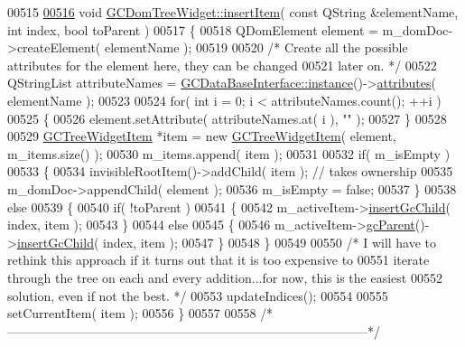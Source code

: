 \begin{DoxyCode}
00515 
\hypertarget{gcdomtreewidget_8cpp_source_l00516}{}\hyperlink{class_g_c_dom_tree_widget_a5e4117a9b47ac0bd520d32fc54d5f1ed}{00516} \textcolor{keywordtype}{void} \hyperlink{class_g_c_dom_tree_widget_a5e4117a9b47ac0bd520d32fc54d5f1ed}{GCDomTreeWidget::insertItem}( \textcolor{keyword}{const} QString &elementName, \textcolor{keywordtype}{int} index, \textcolor{keywordtype}{bool} 
      toParent )
00517 \{
00518   QDomElement element = m\_domDoc->createElement( elementName );
00519 
00520   \textcolor{comment}{/* Create all the possible attributes for the element here, they can be
       changed}
00521 \textcolor{comment}{    later on. */}
00522   QStringList attributeNames = \hyperlink{class_g_c_data_base_interface_a1baea9c0667aa8b610ec30076fcab84c}{GCDataBaseInterface::instance}()->\hyperlink{class_g_c_data_base_interface_afb1e49e08f98ca453f9ac66340a35642}{attributes}( 
      elementName );
00523 
00524   \textcolor{keywordflow}{for}( \textcolor{keywordtype}{int} i = 0; i < attributeNames.count(); ++i )
00525   \{
00526     element.setAttribute( attributeNames.at( i ), \textcolor{stringliteral}{""} );
00527   \}
00528 
00529   \hyperlink{class_g_c_tree_widget_item}{GCTreeWidgetItem} *item = \textcolor{keyword}{new} \hyperlink{class_g_c_tree_widget_item}{GCTreeWidgetItem}( element, m\_items.size() );
00530   m\_items.append( item );
00531 
00532   \textcolor{keywordflow}{if}( m\_isEmpty )
00533   \{
00534     invisibleRootItem()->addChild( item );  \textcolor{comment}{// takes ownership}
00535     m\_domDoc->appendChild( element );
00536     m\_isEmpty = \textcolor{keyword}{false};
00537   \}
00538   \textcolor{keywordflow}{else}
00539   \{
00540     \textcolor{keywordflow}{if}( !toParent )
00541     \{
00542       m\_activeItem->\hyperlink{class_g_c_tree_widget_item_a197806cd712ae04b129acd1699674df5}{insertGcChild}( index, item );
00543     \}
00544     \textcolor{keywordflow}{else}
00545     \{
00546       m\_activeItem->\hyperlink{class_g_c_tree_widget_item_a1125dbc55a8ba3e50662b8258cb35fdf}{gcParent}()->\hyperlink{class_g_c_tree_widget_item_a197806cd712ae04b129acd1699674df5}{insertGcChild}( index, item );
00547     \}
00548   \}
00549 
00550   \textcolor{comment}{/* I will have to rethink this approach if it turns out that it is too
       expensive to}
00551 \textcolor{comment}{    iterate through the tree on each and every addition...for now, this is the
       easiest}
00552 \textcolor{comment}{    solution, even if not the best. */}
00553   updateIndices();
00554 
00555   setCurrentItem( item );
00556 \}
00557 
00558 \textcolor{comment}{/*
      --------------------------------------------------------------------------------------*/}

\end{DoxyCode}
